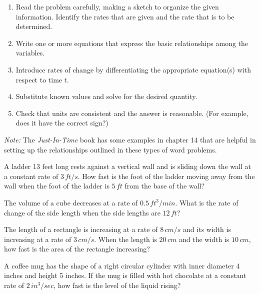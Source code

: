 \documentclass[mathNotesPreamble]{subfiles}
\begin{document}
\begin{thmBox*}
  \begin{enumerate}
    \item Read the problem carefully, making a sketch to organize the given information. Identify the rates that are given and the rate that is to be determined.
    \item Write one or more equations that express the basic relationships among the variables.
    \item Introduce rates of change by differentiating the appropriate equation(s) with respect to time $t$.
    \item Substitute known values and solve for the desired quantity.
    \item Check that units are consistent and the answer is reasonable. (For example, does it have the correct sign?)
  \end{enumerate}
\end{thmBox*}

\textit{Note:} The \textit{Just-In-Time} book has some examples in chapter 14 that are helpful in setting up the relationships outlined in these types of word problems.
\pagebreak

\begin{ex*}
  A ladder 13 feet long rests against a vertical wall and is sliding down the wall at a constant rate of $3\,ft/s$. How fast is the foot of the ladder moving away from the wall when the foot of the ladder is $5\,ft$ from the base of the wall?
\end{ex*}
\pagebreak

\begin{ex*}
  The volume of a cube decreases at a rate of $0.5\,ft^3/min$. What is the rate of change of the side length when the side lengths are $12\,ft$?
\end{ex*}
\pagebreak

\begin{ex*}
  The length of a rectangle is increasing at a rate of $8\,cm/s$ and its width is increasing at a rate of $3\,cm/s$. When the length is $20\,cm$ and the width is $10\,cm$, how fast is the area of the rectangle increasing?
\end{ex*}
\pagebreak

\begin{ex*}
  A coffee mug has the shape of a right circular cylinder with inner diameter 4 inches and height 5 inches. If the mug is filled with hot chocolate at a constant rate of $2\,in^3/sec$, how fast is the level of the liquid rising?
\end{ex*}
\pagebreak
\end{document}
